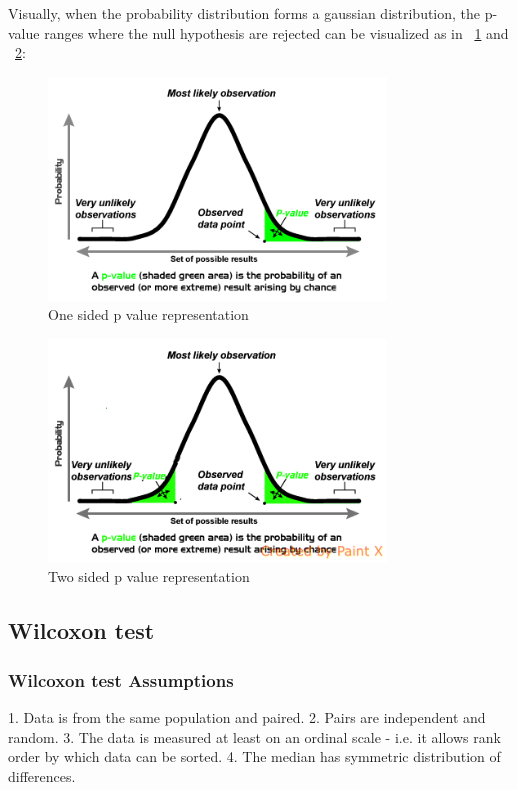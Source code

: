 \documentclass[12pt]{article}
\begin{document}
Visually, when the probability distribution forms a gaussian distribution, the p-value ranges where the null hypothesis are rejected can be visualized as in ~\ref{fig:p_value_one_sided} and ~\ref{fig:p_value_two_sided}:

\begin{figure}[!h]
  \centering
  \includegraphics[width=0.8\textwidth]{p_value_one_sided}
  \caption{One sided p value representation}
  \label{fig:p_value_one_sided}
\end{figure}

\begin{figure}[!h]
  \centering
  \includegraphics[width=0.8\textwidth]{p_value_two_sided}
  \caption{Two sided p value representation}
  \label{fig:p_value_two_sided}
\end{figure}

\subsection{Wilcoxon test}

\subsubsection{Wilcoxon test Assumptions}
1. Data is from the same population and paired.
2. Pairs are independent and random.
3. The data is measured at least on an ordinal scale - i.e. it allows rank order by which data can be sorted.
4. The median has symmetric distribution of differences.
\end{document}
